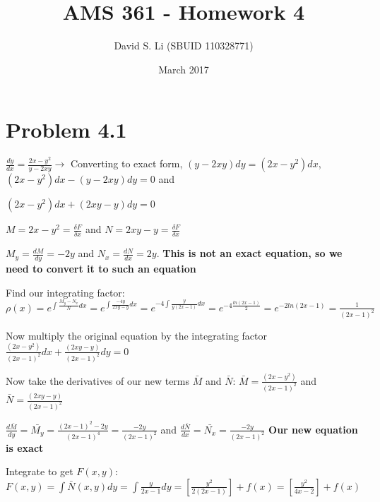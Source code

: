 \documentclass{article}
\title{AMS 361 - Homework 4}
\author{David S. Li (SBUID 110328771)}
\date{March 2017}
\begin{document}
\maketitle

\section{Problem 4.1}

$\frac{dy}{dx} = \frac{2x - y^{2}}{y - 2xy} \rightarrow$ Converting to exact form, $(y - 2xy)dy = (2x - y^{2})dx$, $(2x - y^{2})dx - (y - 2xy)dy = 0$ and \par
\noindent $(2x - y^{2})dx + (2xy - y)dy = 0$ \par\vspace{0.25cm}

\noindent $M = 2x - y^{2} = \frac{\delta F}{\delta x}$ and $N = 2xy - y = \frac{\delta F}{\delta x}$ \par\vspace{0.25cm}

\noindent $M_{y} = \frac{dM}{dy} = -2y$ and $N_{x} = \frac{dN}{dx} = 2y$.  \textbf{This is not an exact equation, so we need to convert it to such an equation} \par\vspace{0.25cm}

\noindent Find our integrating factor: $\rho (x) = e^{\int \frac{M_{y} - N_{x}}{N} dx} = e^{\int \frac{-4y}{2xy - y} dx} = e^{-4 \int \frac{y}{y(2x - 1)} dx} = e^{-4\frac{ln(2x - 1)}{2}} = e^{-2ln(2x - 1)} = \frac{1}{(2x - 1)^{2}}$ \par\vspace{0.25cm}

\noindent Now multiply the original equation by the integrating factor $\frac{(2x - y^{2})}{(2x - 1)^{2}} dx + \frac{(2xy - y)}{(2x - 1)^{2}}dy = 0$ \par
\noindent Now take the derivatives of our new terms $\bar{M}$ and $\bar{N}$: $\bar{M} = \frac{(2x - y^{2})}{(2x - 1)^{2}}$ and $\bar{N} = \frac{(2xy - y)}{(2x - 1)^{2}}$ \par
\noindent $\frac{d\bar{M}}{dy} = \bar{M_{y}} = \frac{(2x - 1)^{2} -2y}{(2x - 1)^{4}} = \frac{-2y}{(2x - 1)^{2}}$ and $\frac{d\bar{N}}{dx} = \bar{N_{x}} = \frac{-2y}{(2x - 1)^{2}}$ \textbf{Our new equation is exact} \par\vspace{0.25cm}

\noindent Integrate to get $F(x, y)$: $F(x, y) = \int \bar{N}(x, y)dy = \int \frac{y}{2x - 1}dy = [\frac{y^{2}}{2(2x - 1)}] + f(x) = [\frac{y^{2}}{4x - 2}] + f(x)$ \par\vspace{0.25cm}
\end{document}
